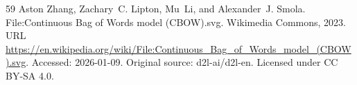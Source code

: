 \begin{thebibliography}{59}
Aston Zhang, Zachary~C. Lipton, Mu~Li, and Alexander~J. Smola.
\newblock File:{Continuous Bag of Words model (CBOW).svg}.
\newblock Wikimedia Commons, 2023.
\newblock URL \url{https://en.wikipedia.org/wiki/File:Continuous_Bag_of_Words_model_(CBOW).svg}.
\newblock Accessed: 2026-01-09. Original source: d2l-ai/d2l-en. Licensed under CC BY-SA 4.0.

\end{thebibliography}
